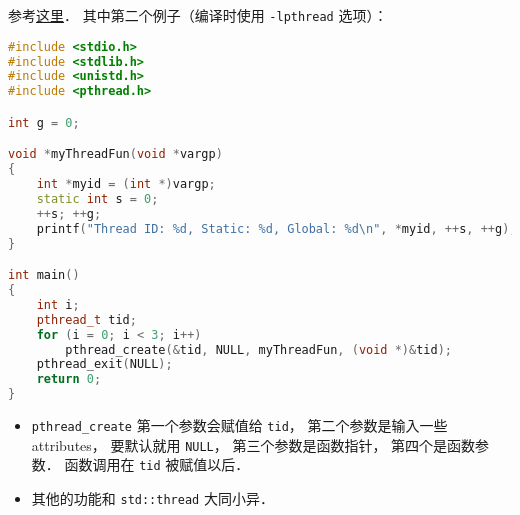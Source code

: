 
\begin{issues}
\issueDraft
\end{issues}

参考\href{https://www.geeksforgeeks.org/multithreading-c-2/}{这里}． 其中第二个例子（编译时使用 \verb|-lpthread| 选项）：
\begin{lstlisting}[language=cpp]
#include <stdio.h>
#include <stdlib.h>
#include <unistd.h>
#include <pthread.h>

int g = 0;

void *myThreadFun(void *vargp)
{
	int *myid = (int *)vargp;
	static int s = 0;
	++s; ++g;
	printf("Thread ID: %d, Static: %d, Global: %d\n", *myid, ++s, ++g);
}

int main()
{
	int i;
	pthread_t tid;
	for (i = 0; i < 3; i++)
		pthread_create(&tid, NULL, myThreadFun, (void *)&tid);
	pthread_exit(NULL);
	return 0;
}
\end{lstlisting}

\begin{itemize}
\item \verb|pthread_create| 第一个参数会赋值给 \verb|tid|， 第二个参数是输入一些 attributes， 要默认就用 \verb|NULL|， 第三个参数是函数指针， 第四个是函数参数． 函数调用在 \verb|tid| 被赋值以后．
\item 其他的功能和 \verb|std::thread| 大同小异．
\end{itemize}


